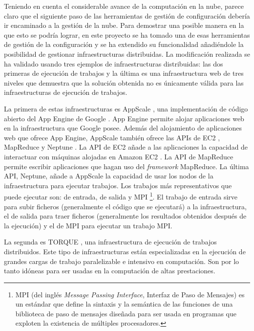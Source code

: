 Teniendo en cuenta el considerable avance de la computación en la nube, parece claro que el siguiente paso de las herramientas de gestión de configuración debería ir encaminado a la gestión de la nube. Para demostrar una posible manera en la que esto se podría lograr, en este proyecto se ha tomado una de esas herramientas de gestión de la configuración y se ha extendido su funcionalidad añadiéndole la posibilidad de gestionar infraestructuras distribuidas. La modificación realizada se ha validado usando tres ejemplos de infraestructuras distribuidas: las dos primeras de ejecución de trabajos y la última es una infraestructura web de tres niveles que demuestra que la solución obtenida no es únicamente válida para las infraestructuras de ejecución de trabajos.

La primera de estas infraestructuras es AppScale \cite{appscale}, una implementación de código abierto del App Engine de Google \cite{appengine}. App Engine permite alojar aplicaciones web en la infraestructura que Google posee. Además del alojamiento de aplicaciones web que ofrece App Engine, AppScale también ofrece las APIs de EC2 \cite{appscale-ec2}, MapReduce \cite{appscale-mapreduce} y Neptune \cite{appscale-neptune}. La API de EC2 añade a las aplicaciones la capacidad de interactuar con máquinas alojadas en Amazon EC2 \cite{amazon-ec2}. La API de MapReduce permite escribir aplicaciones que hagan uso del \emph{framework} MapReduce. La última API, Neptune, añade a AppScale la capacidad de usar los nodos de la infraestructura para ejecutar trabajos. Los trabajos más representativos que puede ejecutar son: de entrada, de salida y MPI \footnote[1]{MPI (del inglés \emph{Message Passing Interface}, Interfaz de Paso de Mensajes) es un estándar que define la sintaxis y la semántica de las funciones de una biblioteca de paso de mensajes diseñada para ser usada en programas que exploten la existencia de múltiples procesadores.}. El trabajo de entrada sirve para subir ficheros (generalmente el código que se ejecutará) a la infraestructura, el de salida para traer ficheros (generalmente los resultados obtenidos después de la ejecución) y el de MPI para ejecutar un trabajo MPI.

La segunda es TORQUE \cite{Staples:2006:TRM:1188455.1188464, torque}, una infraestructura de ejecución de trabajos distribuidos. Este tipo de infraestructuras están especializadas en la ejecución de grandes cargas de trabajo paralelizable e intensivo en computación. Son por lo tanto idóneas para ser usadas en la computación de altas prestaciones.


